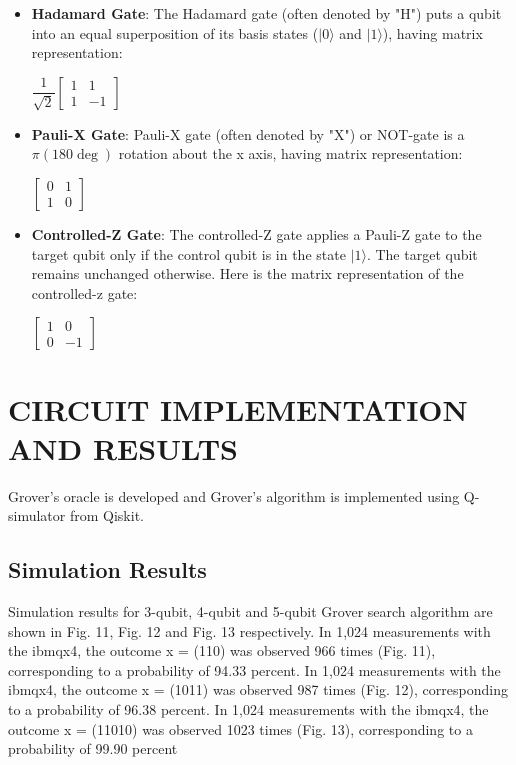 \documentclass[conference]{IEEEtran}
\begin{document}
\begin{itemize}
	\item \textbf{Hadamard Gate}: The Hadamard gate (often denoted by "H") puts a qubit into an equal superposition of its basis states ($| 0 \rangle $ and $| 1 \rangle $),
	      having matrix representation: \\
	      \begin{center}
		      $\dfrac{1}{\sqrt{2}}
			      \begin{bmatrix}
				      1 & 1  \\
				      1 & -1
			      \end{bmatrix}$
	      \end{center}
	\item \textbf{Pauli-X Gate}: Pauli-X gate (often denoted by "X") or NOT-gate is a $ \pi (180\deg) $ rotation about the x axis, having matrix representation:
	      \begin{center}
		      $ \begin{bmatrix}
				      0 & 1 \\
				      1 & 0
			      \end{bmatrix}$
	      \end{center}
	\item \textbf{Controlled-Z Gate}: The controlled-Z gate applies a
	      Pauli-Z gate to the target qubit only if the control qubit is
	      in the state  $| 1 \rangle $. The target qubit remains unchanged otherwise. Here is the matrix representation of the controlled-z gate:
	      \begin{center}
		      $ \begin{bmatrix}
				      1 & 0  \\
				      0 & -1
			      \end{bmatrix} $
	      \end{center}
\end{itemize}

\section{CIRCUIT IMPLEMENTATION AND RESULTS}
Grover’s oracle is developed and Grover's algorithm is implemented using Q-simulator from
Qiskit.

\subsection{Simulation Results}
Simulation results for 3-qubit, 4-qubit and 5-qubit Grover
search algorithm are shown in Fig. 11, Fig. 12 and Fig.
13 respectively. In 1,024 measurements with the ibmqx4,
the outcome x = (110) was observed 966 times (Fig. 11),
corresponding to a probability of 94.33 percent. In 1,024
measurements with the ibmqx4, the outcome x = (1011) was
observed 987 times (Fig. 12), corresponding to a probability
of 96.38 percent. In 1,024 measurements with the ibmqx4,
the outcome x = (11010) was observed 1023 times (Fig. 13),
corresponding to a probability of 99.90 percent
\end{document}

